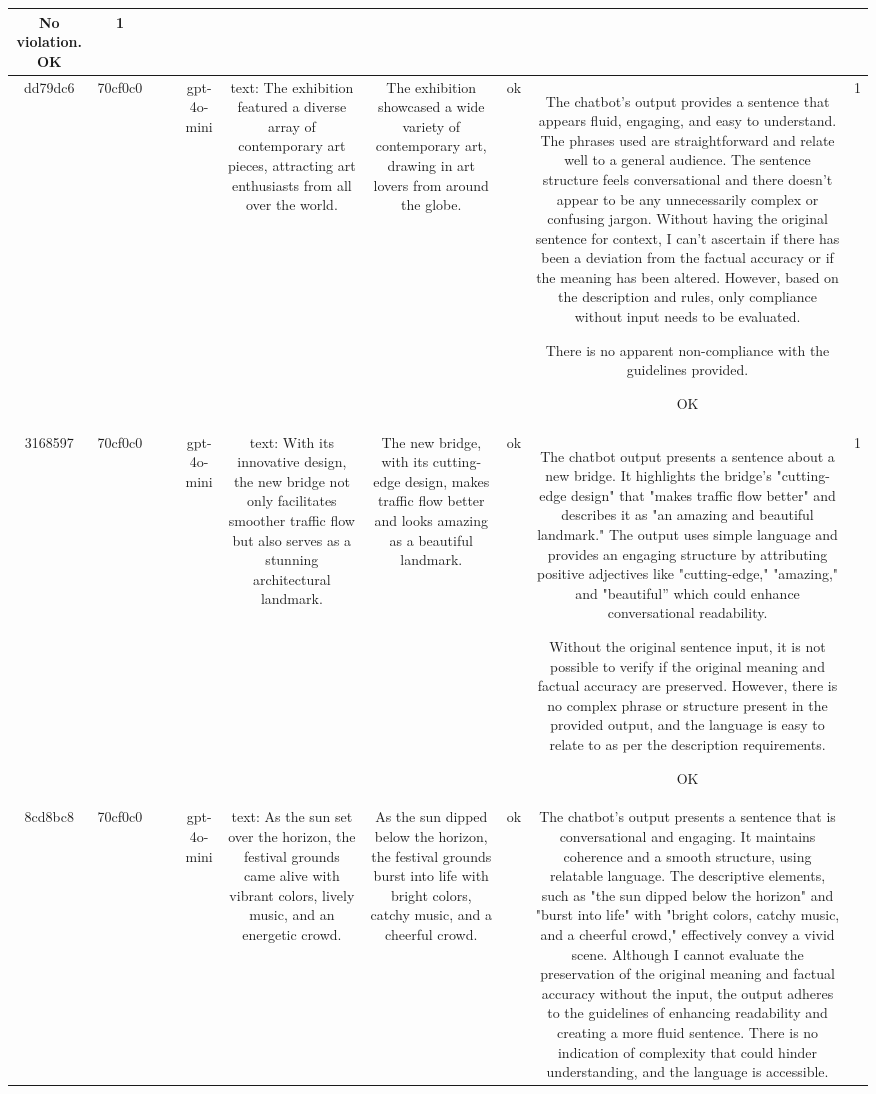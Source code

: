 \begin{table}[h!]
\begin{tabular}{|c|c|c|c|c|c|c|c|c|c|}
No violation.
OK & 1\\
\hline
dd79dc6 & 70cf0c0 &  &  & gpt-4o-mini & text: The exhibition featured a diverse array of contemporary art pieces, attracting art enthusiasts from all over the world. & The exhibition showcased a wide variety of contemporary art, drawing in art lovers from around the globe. & ok & The chatbot's output provides a sentence that appears fluid, engaging, and easy to understand. The phrases used are straightforward and relate well to a general audience. The sentence structure feels conversational and there doesn’t appear to be any unnecessarily complex or confusing jargon. Without having the original sentence for context, I can't ascertain if there has been a deviation from the factual accuracy or if the meaning has been altered. However, based on the description and rules, only compliance without input needs to be evaluated.

There is no apparent non-compliance with the guidelines provided.

OK & 1\\
\hline
3168597 & 70cf0c0 &  &  & gpt-4o-mini & text: With its innovative design, the new bridge not only facilitates smoother traffic flow but also serves as a stunning architectural landmark. & The new bridge, with its cutting-edge design, makes traffic flow better and looks amazing as a beautiful landmark. & ok & The chatbot output presents a sentence about a new bridge. It highlights the bridge's "cutting-edge design" that "makes traffic flow better" and describes it as "an amazing and beautiful landmark." The output uses simple language and provides an engaging structure by attributing positive adjectives like "cutting-edge," "amazing," and "beautiful” which could enhance conversational readability. 

Without the original sentence input, it is not possible to verify if the original meaning and factual accuracy are preserved. However, there is no complex phrase or structure present in the provided output, and the language is easy to relate to as per the description requirements.

OK & 1\\
\hline
8cd8bc8 & 70cf0c0 &  &  & gpt-4o-mini & text: As the sun set over the horizon, the festival grounds came alive with vibrant colors, lively music, and an energetic crowd. & As the sun dipped below the horizon, the festival grounds burst into life with bright colors, catchy music, and a cheerful crowd. & ok & The chatbot's output presents a sentence that is conversational and engaging. It maintains coherence and a smooth structure, using relatable language. The descriptive elements, such as "the sun dipped below the horizon" and "burst into life" with "bright colors, catchy music, and a cheerful crowd," effectively convey a vivid scene. Although I cannot evaluate the preservation of the original meaning and factual accuracy without the input, the output adheres to the guidelines of enhancing readability and creating a more fluid sentence. There is no indication of complexity that could hinder understanding, and the language is accessible. 


\end{tabular}
\end{table}
